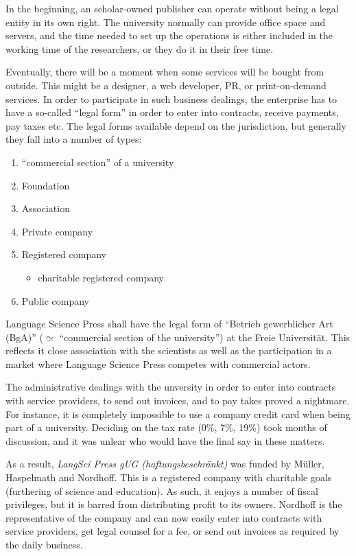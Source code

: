 \documentclass[output=guidelines,nonflat,smallfont,
draftmode
]{langsci/langscibook}
\newcommand{\background}[1]{ 
  \vspace{5mm}
  \renewcommand{\tblslinecolour}{lsDarkBlue}
  \tblssy[red]{explore2}{Background}{\vspace*{-5mm}#1}
}
\newcommand{\langscisolution}[1]{
  \renewcommand{\tblslinecolour}{lsLightBlue}
  \tblssy{langsci}{LangSci solution}{\vspace*{-5mm}#1}
}
\newcommand{\evaluation}[1]{
  \renewcommand{\tblslinecolour}{lsLightOrange}
  \tblssy{receipt}{Evaluation}{\vspace*{-5mm}#1}
}
\renewcommand{\tblssy}[4][black!12]{%
  \renewcommand{\langscisymbol}{#2}\renewcommand{\tblsboxcolor}{#1}
  \begin{mdframed}[style=yellowexercise,frametitle={#3}]
    #4
  \end{mdframed}
}
\begin{document}
\background{In the beginning, an scholar-owned publisher can operate without being a legal entity in its own right. The university normally can provide office space and servers, and the time needed to set up the operations is either included in the working time of the researchers, or they do it in their free time. 

Eventually, there will be a moment when some services will be bought from outside. This might be a designer, a web developer, PR, or print-on-demand services. In order to participate in such business dealings, the enterprise has to have a so-called ``legal form'' in order to enter into contracts, receive payments, pay taxes etc. The legal forms available depend on the jurisdiction, but generally they fall into a number of types:

\begin{enumerate}
 \item ``commercial section'' of a university
 \item Foundation 
 \item Association 
 \item Private company
 \item Registered company 
 \begin{itemize}
  \item charitable registered company
 \end{itemize}
 \item Public company 
\end{enumerate} 
}
\langscisolution{
Language Science Press shall have the legal form of ``Betrieb gewerblicher Art (BgA)'' ($\simeq$ ``commercial section of the university'') at the Freie Universität.
This reflects it close association with the scientists as well as the participation in a market where Language Science Press competes with commercial actors. 
}
\evaluation{
The administrative dealings with the unversity in order to enter into contracts with service providers, to send out invoices, and to pay takes proved a nightmare. For instance, it is completely impossible to use a company credit card when being part of a university. Deciding on the tax rate (0\%, 7\%, 19\%) took months of discussion, and it was unlear who would have the final say in these matters. 

As a result, \textit{LangSci Press gUG (haftungsbeschränkt)} was funded by Müller, Haspelmath and Nordhoff. This is a registered company with charitable goals (furthering of science and education). As such, it enjoys a number of fiscal privileges, but it is barred from  distributing profit to its owners. Nordhoff is the representative of the company and can now easily enter into contracts with service providers, get legal counsel for a fee, or send out invoices as required by the daily business. 
}
\end{document}
